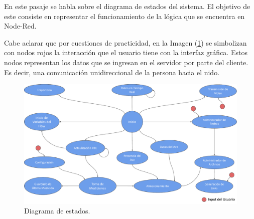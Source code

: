 En este pasaje se habla sobre el diagrama de estados del sistema. El objetivo de este consiste en representar el funcionamiento de la lógica que se encuentra en Node-Red.

Cabe aclarar que por cuestiones de practicidad, en la Imagen (\ref{fig:diagrama_de_estados}) se simbolizan con nodos rojos la interacción que el usuario tiene con la interfaz gráfica. Estos nodos representan los datos que se ingresan en el servidor por parte del cliente. Es decir, una comunicación unidireccional de la persona hacia el nido.

\begin{figure}[H]
	\centering	
	\includegraphics[width=\textwidth, page=1]{ImagenesIngenieria de Detalle/FlowChartNodeRed.pdf}	
	\caption{Diagrama de estados.}
	\label{fig:diagrama_de_estados}
\end{figure}
